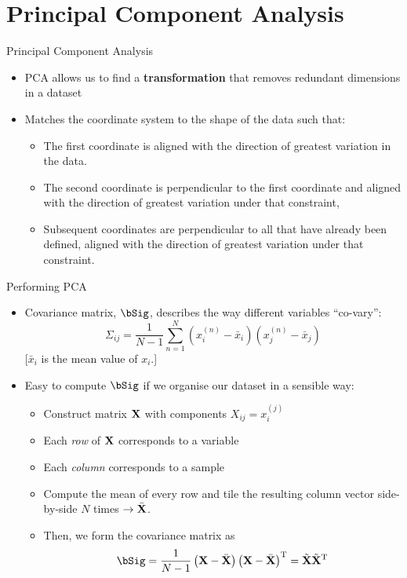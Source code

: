 \documentclass{beamer}
\begin{document}
\section{Principal Component Analysis}

\begin{frame}{Principal Component Analysis}
  \begin{itemize}
    \item PCA allows us to find a \textbf{transformation} that removes redundant dimensions in a dataset
    \item Matches the coordinate system to the shape of the data such that:
    \begin{itemize}
      \item The first coordinate is aligned with the direction of greatest variation in the data.
      \item The second coordinate is perpendicular to the first coordinate and aligned with the direction of greatest variation under that constraint,
      \item Subsequent coordinates are perpendicular to all that have already been defined, aligned with the direction of greatest variation under that constraint.
    \end{itemize}
  \end{itemize}
\end{frame}

\begin{frame}{Performing PCA}
  \begin{itemize}
    \item Covariance matrix, $\bSig$, describes the way different variables ``co-vary'':
      \begin{equation*}
        \Sigma_{ij} = \frac{1}{N-1}\sum_{n=1}^N \left(x_i^{(n)}-\bar x_i\right)\left(x_j^{(n)}-\bar x_j\right)
      \end{equation*}
      [$\bar x_i$ is the mean value of $x_i$.]
    \item Easy to compute $\bSig$ if we organise our dataset in a sensible way:
      \begin{itemize}
        \item Construct matrix $\mathbf{X}$ with components $X_{ij} = x_i^{(j)}$
        \item Each \textit{row} of $\mathbf{X}$ corresponds to a variable
        \item Each \textit{column} corresponds to a sample
        \item Compute the mean of every row and tile the resulting column vector side-by-side $N$ times $\rightarrow\bar{\mathbf{X}}$.
        \item Then, we form the covariance matrix as
          \begin{equation}
            \bSig = \frac{1}{N-1}\left(\bX-\bar\bX\right)\left(\bX-\bar\bX\right)^\rT = \tilde\bX\tilde\bX^\rT
          \end{equation}
      \end{itemize}
  \end{itemize}
\end{frame}
\end{document}
